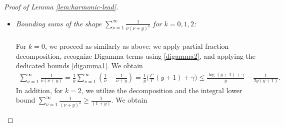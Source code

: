 \documentclass[11pt,letterpaper,oneside,reqno]{amsart}
\renewcommand{\^}[1]{\widehat{#1}}
\numberwithin{equation}{section}
\theoremstyle{remark}
\begin{document}
\begin{proof}[Proof of Lemma \ref{lem:harmonic-lead}]
\begin{itemize}
Before moving onto higher power of $(\nu-y)$, we note that, for $k \geq 2$, 
\[
\sum_{\nu>N} \frac1{(\nu-y)^k} 
=\frac1{(N+1-y)^k}+\frac1{(N+2-y)^k}+ \sum_{\nu>N+2} \frac1{(\nu-y)^k}.
\]
Standard integral comparison estimates directly imply:
\begin{equation}\label{sum-(nu-y)^2}
\frac{1}{\Delta^2} + \frac{1}{\Delta+1} < \sum_{\nu>N} \frac{1}{(\nu-y)^2} < \frac{1}{\Delta^2} + \frac{1}{(\Delta+1)^2} + \frac{1}{\Delta+1},
\end{equation}
and
\begin{equation}\label{sum-(nu-y)^3}
\frac{1}{\Delta^3} + \frac{1}{2(\Delta+1)^2} < \sum_{\nu>N} \frac{1}{(\nu-y)^3} < \frac{1}{\Delta^3} + \frac{1}{(\Delta+1)^3} + \frac{1}{2(\Delta+1)^2}.
\end{equation}
As partial fraction decomposition allows to rewrite
\[
\sum_{\nu>N} \frac{1}{\nu(\nu-y)^2} = - \frac1{y} \sum_{\nu>N}  \frac1{\nu(\nu -y)}+\frac1{y}\sum_{\nu>N}\frac1{(\nu-y)^2},
\]
we conclude to \eqref{bnd-sum-nu(nu-y)^2bupper} by combining \eqref{bnd-sum-nu(nu-y)blower-bupper} and \eqref{sum-(nu-y)^2}. 
Similarly, we combine 
\[
\sum_{\nu>N} \frac{1}{\nu(\nu-y)^3} = \frac1{y^2} \sum_{\nu>N}\frac1{\nu(\nu-y)} - \frac1{y^2} \sum_{\nu>N} \frac1{(\nu-y)^2} + \frac1{y}\sum_{\nu>N} \frac1{(\nu-y)^3}
\]
with \eqref{sum-nu(nu-y)-b}, \eqref{sum-(nu-y)^2} and \eqref{sum-(nu-y)^3} to conclude to \eqref{bnd-sum-nu(nu-y)^3bupper}.
\item{\it Bounding sums of the shape $\sum_{\nu=1}^{\infty}\frac{1}{\nu(\nu+y)^k} $ for $k=0,1,2$:}\\\\
For $k=0$, we proceed as similarly as above: we apply partial fraction decomposition, recognize Digamma terms using \eqref{digamma2}, and applying the dedicated bounds \eqref{digamma1}. 
We obtain
\begin{equation}\label{eq:explicit_bound_plus_y}
\begin{aligned}
\sum_{\nu=1}^\infty \frac{1}{\nu(\nu+y)} 
= \frac{1}{y} \sum_{\nu=1}^\infty \left( \frac{1}{\nu} - \frac{1}{\nu+y} \right) = \frac1{y}\Big(\frac{\Gamma'}{\Gamma}(y+1)+\gamma\Big)
\leq \frac{\log(y+1) + \gamma}{y} - \frac{1}{2y(y+1)}.
\end{aligned}
\end{equation}
%
In addition, for $k=2$, we utilize the decomposition and the integral lower bound $\sum_{\nu=1}^\infty \frac{1}{(\nu+y)^2} \geq \frac{1}{(1+y)}$. We obtain

\end{itemize}
\end{proof}
\end{document}

